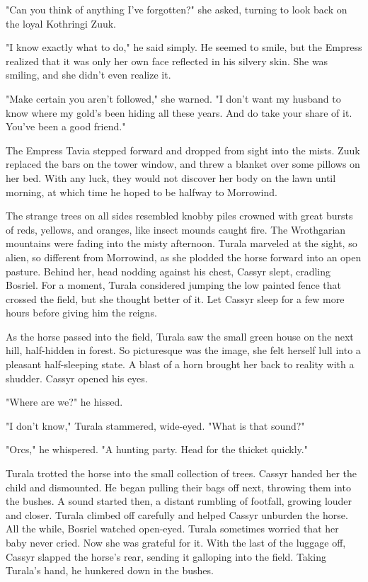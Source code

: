 "Can you think of anything I've forgotten?" she asked, turning to look back on the loyal Kothringi Zuuk.

"I know exactly what to do," he said simply. He seemed to smile, but the Empress realized that it was only her own face reflected in his silvery skin. She was smiling, and she didn't even realize it.

"Make certain you aren't followed," she warned. "I don't want my husband to know where my gold's been hiding all these years. And do take your share of it. You've been a good friend."

The Empress Tavia stepped forward and dropped from sight into the mists. Zuuk replaced the bars on the tower window, and threw a blanket over some pillows on her bed. With any luck, they would not discover her body on the lawn until morning, at which time he hoped to be halfway to Morrowind.

The strange trees on all sides resembled knobby piles crowned with great bursts of reds, yellows, and oranges, like insect mounds caught fire. The Wrothgarian mountains were fading into the misty afternoon. Turala marveled at the sight, so alien, so different from Morrowind, as she plodded the horse forward into an open pasture. Behind her, head nodding against his chest, Cassyr slept, cradling Bosriel. For a moment, Turala considered jumping the low painted fence that crossed the field, but she thought better of it. Let Cassyr sleep for a few more hours before giving him the reigns.

As the horse passed into the field, Turala saw the small green house on the next hill, half-hidden in forest. So picturesque was the image, she felt herself lull into a pleasant half-sleeping state. A blast of a horn brought her back to reality with a shudder. Cassyr opened his eyes.

"Where are we?" he hissed.

"I don't know," Turala stammered, wide-eyed. "What is that sound?"

"Orcs," he whispered. "A hunting party. Head for the thicket quickly."

Turala trotted the horse into the small collection of trees. Cassyr handed her the child and dismounted. He began pulling their bags off next, throwing them into the bushes. A sound started then, a distant rumbling of footfall, growing louder and closer. Turala climbed off carefully and helped Cassyr unburden the horse. All the while, Bosriel watched open-eyed. Turala sometimes worried that her baby never cried. Now she was grateful for it. With the last of the luggage off, Cassyr slapped the horse's rear, sending it galloping into the field. Taking Turala's hand, he hunkered down in the bushes.

